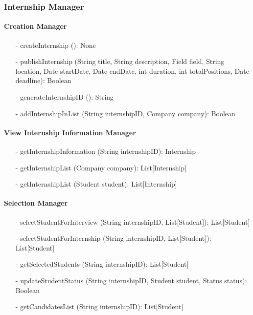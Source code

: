 \subsubsection{Internship Manager}
\paragraph{Creation Manager}
\begin{itemize}
    \item[-] createInternship (): None
    \item[-] publishInternship (String title, String description, Field field, String location, Date startDate, Date endDate, int duration, int totalPositions, 
    Date deadline): Boolean
    \item[-] generateInternshipID (): String
    \item[-] addInternshipInList (String internshipID, Company company): Boolean
\end{itemize}

\paragraph{View Internship Information Manager}
\begin{itemize}
    \item[-] getInternshipInformation (String internshipID): Internship
    \item[-] getInternshipList (Company company): List[Internship]
    \item[-] getInternshipList (Student student): List[Internship]
\end{itemize}

\paragraph{Selection Manager}
\begin{itemize}
    \item[-] selectStudentForInterview (String internshipID, List[Student]): List[Student]
    \item[-] selectStudentForInternship (String internshipID, List[Student]): List[Student]
    \item[-] getSelectedStudents (String internshipID): List[Student]
    \item[-] updateStudentStatus (String internshipID, Student student, Status status): Boolean
    \item[-] getCandidatesList (String internshipID): List[Student]
\end{itemize}

